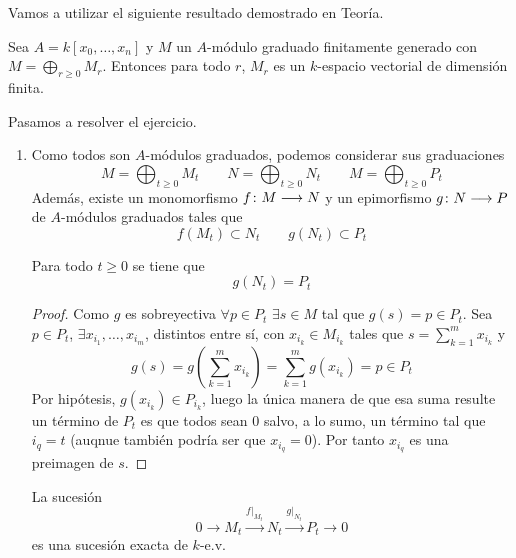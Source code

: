\documentclass[twoside]{article}
\begin{document}
\begin{solucion}Vamos a utilizar el siguiente resultado demostrado en Teoría.
\begin{lemma}\label{lemma:1}
Sea $A = k[x_0,\dots,x_n]$ y $M$ un $A$-módulo graduado finitamente generado con $M = \bigoplus_{r≥0} M_r$. Entonces para todo $r$, $M_r$ es un $k$-espacio vectorial de dimensión finita.
\end{lemma}
Pasamos a resolver el ejercicio.
\begin{enumerate}
\item  Como todos son $A$-módulos graduados, podemos considerar sus graduaciones
$$
M=\bigoplus_{t\geq 0} M_t \qquad N=\bigoplus_{t\geq 0} N_t \qquad M=\bigoplus_{t\geq 0} P_t $$
Además, existe un monomorfismo $f\colon{M}\longrightarrow{N}$ y un epimorfismo $g\colon{N}\longrightarrow{P}$ de $A$-módulos graduados tales que
\begin{equation}\label{eq:1}
f(M_t) \subset N_t \qquad g(N_t) \subset P_t
\end{equation}
\begin{lemma}\label{lemma:2}
Para todo $t\geq 0$ se tiene que 
$$g(N_t)=P_t$$
\end{lemma}
\begin{proof}
Como $g$ es sobreyectiva $\forall p\in P_t$ $\exists s\in M$ tal que $g(s)= p \in P_t$. Sea $p\in P_t$, $\exists x_{i_1},\dotsc,x_{i_m}$, distintos entre sí, con $x_{i_k}\in M_{i_k}$ tales que $s =\sum_{k=1}^m x_{i_k}$ y 
$$
g(s)=g\left(\sum_{k=1}^m x_{i_k}\right) = \sum_{k=1}^m g(x_{i_k}) = p \in P_t
$$ Por hipótesis, $g(x_{i_k})\in P_{i_k}$, luego la única manera de que esa suma resulte un término de $P_t$ es que todos sean $0$ salvo, a lo sumo, un término tal que $i_q = t$ (auqnue también podría ser que $x_{i_q}=0$). Por tanto $x_{i_q}$ es una preimagen de $s$. 
\end{proof}
\begin{lemma}\label{lemma:3} La sucesión
$$0\to M_t\overset{f|_{M_t}}{\to} N_t\overset{g|_{N_t}}{\to} P_t \to 0$$
es una sucesión exacta de $k$-e.v. 
\end{lemma}


\end{enumerate}
\end{solucion}
\end{document}
